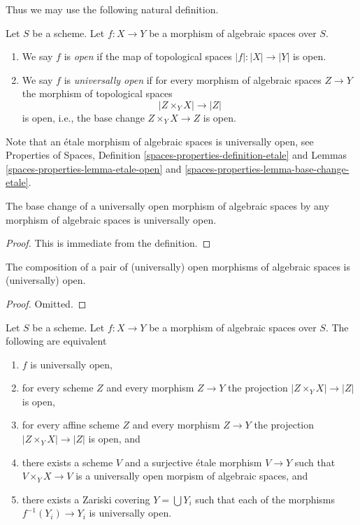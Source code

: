 \noindent
Thus we may use the following natural definition.

\begin{definition}
\label{definition-open}
Let $S$ be a scheme. Let $f : X \to Y$ be a morphism of algebraic spaces
over $S$.
\begin{enumerate}
\item We say $f$ is {\it open} if the map of topological spaces
$|f| : |X| \to |Y|$ is open.
\item We say $f$ is {\it universally open} if for every morphism
of algebraic spaces $Z \to Y$ the morphism of topological spaces
$$
|Z \times_Y X| \to |Z|
$$
is open, i.e., the base change $Z \times_Y X \to Z$ is open.
\end{enumerate}
\end{definition}

\noindent
Note that an \'etale morphism of algebraic spaces is universally open,
see
Properties of Spaces, Definition \ref{spaces-properties-definition-etale} and
Lemmas \ref{spaces-properties-lemma-etale-open} and
\ref{spaces-properties-lemma-base-change-etale}.

\begin{lemma}
\label{lemma-base-change-universally-open}
The base change of a universally open morphism of algebraic spaces
by any morphism of algebraic spaces is universally open.
\end{lemma}

\begin{proof}
This is immediate from the definition.
\end{proof}

\begin{lemma}
\label{lemma-composition-open}
The composition of a pair of (universally) open morphisms of algebraic spaces
is (universally) open.
\end{lemma}

\begin{proof}
Omitted.
\end{proof}

\begin{lemma}
\label{lemma-universally-open-local}
Let $S$ be a scheme. Let $f : X \to Y$ be a morphism of algebraic spaces
over $S$. The following are equivalent
\begin{enumerate}
\item $f$ is universally open,
\item for every scheme $Z$ and every morphism $Z \to Y$
the projection $|Z \times_Y X| \to |Z|$ is open,
\item for every affine scheme $Z$ and every morphism $Z \to Y$
the projection $|Z \times_Y X| \to |Z|$ is open, and
\item there exists a scheme $V$ and a surjective \'etale morphism
$V \to Y$ such that $V \times_Y X \to V$ is a universally open morpism
of algebraic spaces, and
\item there exists a Zariski covering $Y = \bigcup Y_i$ such that
each of the morphisms $f^{-1}(Y_i) \to Y_i$ is universally open.
\end{enumerate}
\end{lemma}

